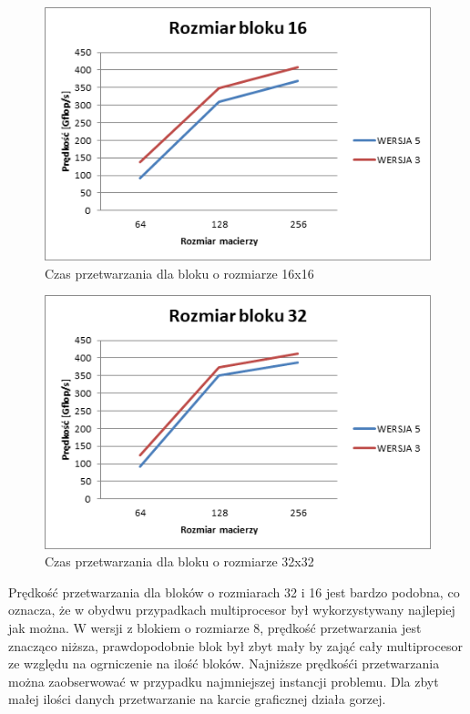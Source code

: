\documentclass{article}
\begin{document}
\begin{figure}[H]
	\centering
	\includegraphics[width=\linewidth]{./images/graphs/fast/graph2.png}
	\caption{Czas przetwarzania dla bloku o rozmiarze 16x16}
	\label{fig:graphf2}
\end{figure}

\begin{figure}[H]
	\centering
	\includegraphics[width=\linewidth]{./images/graphs/fast/graph3.png}
	\caption{Czas przetwarzania dla bloku o rozmiarze 32x32}
	\label{fig:graphf3}
\end{figure}

Prędkość przetwarzania dla bloków o rozmiarach 32 i 16 jest bardzo podobna, co oznacza, że w obydwu przypadkach multiprocesor był wykorzystywany najlepiej jak można. W wersji z blokiem o rozmiarze 8, prędkość przetwarzania jest znacząco niższa, prawdopodobnie blok był zbyt mały by zająć cały multiprocesor ze względu na ogrniczenie na ilość bloków. Najniższe prędkośći przetwarzania można zaobserwować w przypadku najmniejszej instancji problemu. Dla zbyt małej ilości danych przetwarzanie na karcie graficznej działa gorzej.
\end{document}

